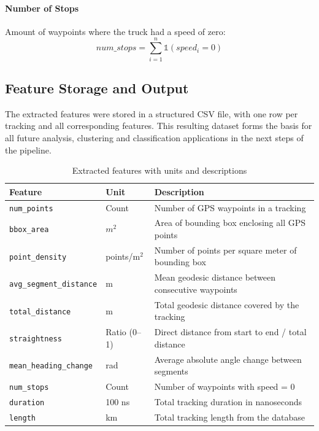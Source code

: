 \documentclass[a4paper,12pt,twoside]{scrreprt}
\begin{document}
\paragraph{Number of Stops}
Amount of waypoints where the truck had a speed of zero:
\[
  num\_stops = \sum_{i=1}^{n} \mathbb{1}(speed_i = 0)
\]

\subsection{Feature Storage and Output}

The extracted features were stored in a structured CSV file, with one row per
tracking and all corresponding features. This resulting dataset forms the
basis for all future analysis, clustering and classification applications in
the next steps of the pipeline.

\begin{table}[ht]
  \centering
  \begin{tabular}{|l|l|l|}
    \hline
    \textbf{Feature}                & \textbf{Unit} & \textbf{Description}
    \\
    \hline
    \texttt{num\_points}            & Count         & Number of GPS waypoints
    in a tracking
    \\
    \texttt{bbox\_area}             & $m^2$         & Area of bounding box
    enclosing all GPS points
    \\
    \texttt{point\_density}         & points/m$^2$  & Number of points per
    square meter
    of bounding box
    \\
    \texttt{avg\_segment\_distance} & m             & Mean geodesic distance
    between
    consecutive waypoints
    \\
    \texttt{total\_distance}        & m             & Total geodesic distance
    covered by the
    tracking
    \\
    \texttt{straightness}           & Ratio (0–1)   & Direct distance from
    start to end /
    total distance
    \\
    \texttt{mean\_heading\_change}  & rad           & Average absolute angle
    change
    between segments
    \\
    \texttt{num\_stops}             & Count         & Number of waypoints with
    speed = 0
    \\
    \texttt{duration}               & 100 ns        & Total tracking
    duration in nanoseconds
    \\
    \texttt{length}                 & km            & Total tracking length
    from the database
    \\
    \hline
  \end{tabular}
  \caption{Extracted features with units and descriptions}
  \label{tab:feature_units}
\end{table}
\end{document}
